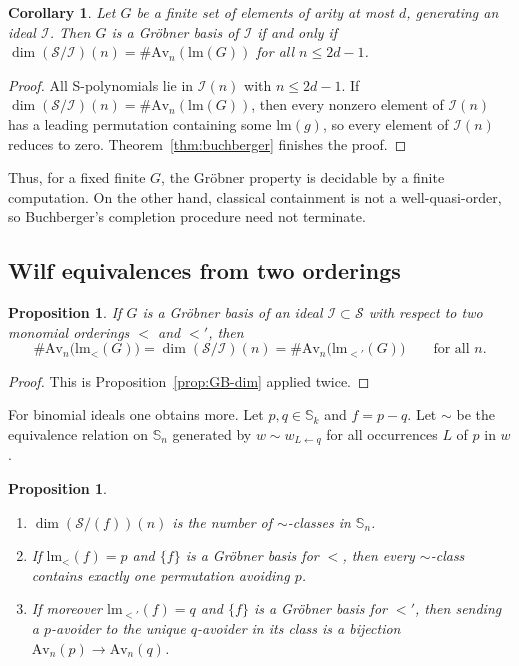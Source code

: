 \documentclass[11pt]{amsart}
\newtheorem{proposition}[theorem]{Proposition}
\newtheorem{corollary}[theorem]{Corollary}
\theoremstyle{definition}
\theoremstyle{remark}
\newcommand{\bS}{\mathbb{S}}
\newcommand{\lm}{\mathrm{lm}}
\newcommand{\cI}{\mathscr{I}}
\newcommand{\cS}{\mathscr{S}}
\newcommand{\Av}{\mathrm{Av}}
\begin{document}
\begin{corollary}\label{cor:finite}
Let $G$ be a finite set of elements of arity at most $d$, generating an ideal $\cI$. Then $G$ is a Gr\"obner basis of $\cI$ if and only if $\dim(\cS/\cI)(n)=\#\Av_n(\lm(G))$ for all $n\le 2d-1$.
\end{corollary}

\begin{proof}
All S-polynomials lie in $\cI(n)$ with $n\le 2d-1$. If $\dim(\cS/\cI)(n)=\#\Av_n(\lm(G))$, then every nonzero element of $\cI(n)$ has a leading permutation containing some $\lm(g)$, so every element of $\cI(n)$ reduces to zero. Theorem~\ref{thm:buchberger} finishes the proof.
\end{proof}

Thus, for a fixed finite $G$, the Gr\"obner property is decidable by a finite computation. On the other hand, classical containment is not a well-quasi-order, so Buchberger's completion procedure need not terminate.

\subsection{Wilf equivalences from two orderings}

\begin{proposition}\label{prop:wilf}
If $G$ is a Gr\"obner basis of an ideal $\cI\subset\cS$ with respect to two monomial orderings $<$ and $<'$, then
\[
\#\Av_n\bigl(\lm_<(G)\bigr)=\dim(\cS/\cI)(n)=\#\Av_n\bigl(\lm_{<'}(G)\bigr)\qquad\text{for all } n .
\]
\end{proposition}

\begin{proof}
This is Proposition~\ref{prop:GB-dim} applied twice.
\end{proof}

For binomial ideals one obtains more. Let $p,q\in\bS_k$ and $f=p-q$. Let $\sim$ be the equivalence relation on $\bS_n$ generated by $w\sim w_{L\leftarrow q}$ for all occurrences $L$ of $p$ in $w$.

\begin{proposition}\label{prop:binomial}
\begin{enumerate}
\item $\dim(\cS/(f))(n)$ is the number of $\sim$-classes in $\bS_n$.
\item If $\lm_<(f)=p$ and $\{f\}$ is a Gr\"obner basis for $<$, then every $\sim$-class contains exactly one permutation avoiding $p$.
\item If moreover $\lm_{<'}(f)=q$ and $\{f\}$ is a Gr\"obner basis for $<'$, then sending a $p$-avoider to the unique $q$-avoider in its class is a bijection $\Av_n(p)\to\Av_n(q)$.
\end{enumerate}
\end{proposition}
\end{document}
